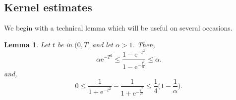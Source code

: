 \documentclass[a4paper,oneside,10pt]{amsproc}
\theoremstyle{plain}
\newtheorem{lemma}{Lemma}
\theoremstyle{remark}
\theoremstyle{definition}
\renewcommand{\leq}{\leqslant}
\renewcommand{\leq}{\leqslant}
\newcommand{\e}{\mathrm{e}} %
\renewcommand{\leq}{\leqslant}%
\begin{document}
\subsection{Kernel estimates}
We begin with a technical lemma which will be useful on several
occasions.
\begin{lemma}\label{lem:Time-part-Mehler-time-transform}
  Let $t$ be in $(0, T]$ and let $\alpha > 1$. Then,
  \begin{equation}
    \label{eq:Time-part-Mehler-time-transform-1}
    \alpha \e^{-T^2} \leq \frac{1 - \e^{-t^2}}{1 -
      \e^{-\frac{t^2}{\alpha}}} \leq \alpha.
  \end{equation}
  and,
  \begin{equation}
    \label{eq:Time-part-Mehler-time-transform-2}
       0 \leq \frac{1}{1 + \e^{-t^2}} - \frac{1}{1 +
         \e^{-\frac{t^2}{\alpha}}} \leq \frac{1}{4} \biggl(1 - \frac1\alpha \biggr).
  \end{equation}
\end{lemma}
\end{document}
